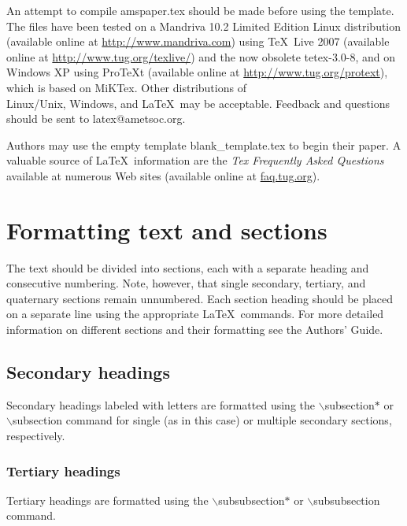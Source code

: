 \documentclass[12pt]{article}
\begin{document}
An attempt to compile amspaper.tex should be made before using the template. The files have been tested on a Mandriva 10.2 Limited Edition Linux
distribution (available online at \url{http://www.mandriva.com}) using \TeX\ Live 2007 (available online at \url{http://www.tug.org/texlive/}) and the now obsolete tetex-3.0-8, and on Windows XP using ProTeXt (available online at \url{http://www.tug.org/protext}), which is based on MiKTex. Other distributions of\\ Linux/Unix, Windows, and \LaTeX\ may be acceptable. Feedback and questions should be sent to latex@ametsoc.org.

Authors may use the empty template blank\_template.tex to begin their paper. A valuable source of \LaTeX\ information are the \textit{Tex Frequently Asked
Questions} available at numerous Web sites (available online at
\url{faq.tug.org}).

\section{Formatting text and sections}
The text should be divided into sections, each with
a separate heading and consecutive numbering. Note, however, that single
secondary, tertiary, and quaternary sections remain unnumbered. Each section heading should be placed on a separate
line using the appropriate \LaTeX\ commands. For more detailed information on different sections and
their formatting see the Authors' Guide.

\subsection*{Secondary headings} %
Secondary headings labeled with letters are formatted using the $\backslash$subsection$*$ or $\backslash$subsection command for single (as in this case) or multiple secondary sections, respectively.

\subsubsection*{Tertiary headings} %
Tertiary headings are formatted using the $\backslash$subsubsection$*$ or $\backslash$subsubsection command.
\end{document}
